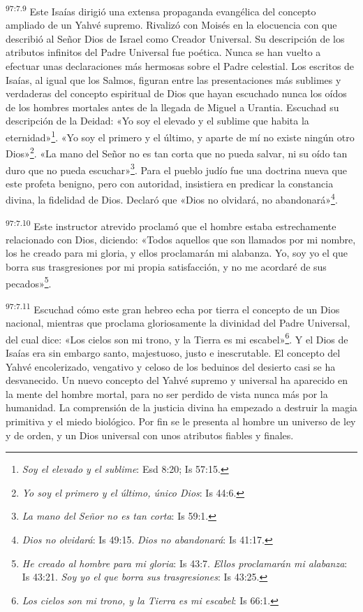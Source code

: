 \par
\textsuperscript{97:7.9} Este Isaías dirigió una extensa propaganda evangélica del concepto ampliado de un Yahvé supremo. Rivalizó con Moisés en la elocuencia con que describió al Señor Dios de Israel como Creador Universal. Su descripción de los atributos infinitos del Padre Universal fue poética. Nunca se han vuelto a efectuar unas declaraciones más hermosas sobre el Padre celestial. Los escritos de Isaías, al igual que los Salmos, figuran entre las presentaciones más sublimes y verdaderas del concepto espiritual de Dios que hayan escuchado nunca los oídos de los hombres mortales antes de la llegada de Miguel a Urantia. Escuchad su descripción de la Deidad: «Yo soy el elevado y el sublime que habita la eternidad»\footnote{\textit{Soy el elevado y el sublime}: Esd 8:20; Is 57:15.}. «Yo soy el primero y el último, y aparte de mí no existe ningún otro Dios»\footnote{\textit{Yo soy el primero y el último, único Dios}: Is 44:6.}. «La mano del Señor no es tan corta que no pueda salvar, ni su oído tan duro que no pueda escuchar»\footnote{\textit{La mano del Señor no es tan corta}: Is 59:1.}. Para el pueblo judío fue una doctrina nueva que este profeta benigno, pero con autoridad, insistiera en predicar la constancia divina, la fidelidad de Dios. Declaró que «Dios no olvidará, no abandonará»\footnote{\textit{Dios no olvidará}: Is 49:15. \textit{Dios no abandonará}: Is 41:17.}.

\par
\textsuperscript{97:7.10} Este instructor atrevido proclamó que el hombre estaba estrechamente relacionado con Dios, diciendo: «Todos aquellos que son llamados por mi nombre, los he creado para mi gloria, y ellos proclamarán mi alabanza. Yo, soy yo el que borra sus trasgresiones por mi propia satisfacción, y no me acordaré de sus pecados»\footnote{\textit{He creado al hombre para mi gloria}: Is 43:7. \textit{Ellos proclamarán mi alabanza}: Is 43:21. \textit{Soy yo el que borra sus trasgresiones}: Is 43:25.}.

\par
\textsuperscript{97:7.11} Escuchad cómo este gran hebreo echa por tierra el concepto de un Dios nacional, mientras que proclama gloriosamente la divinidad del Padre Universal, del cual dice: «Los cielos son mi trono, y la Tierra es mi escabel»\footnote{\textit{Los cielos son mi trono, y la Tierra es mi escabel}: Is 66:1.}. Y el Dios de Isaías era sin embargo santo, majestuoso, justo e inescrutable. El concepto del Yahvé encolerizado, vengativo y celoso de los beduinos del desierto casi se ha desvanecido. Un nuevo concepto del Yahvé supremo y universal ha aparecido en la mente del hombre mortal, para no ser perdido de vista nunca más por la humanidad. La comprensión de la justicia divina ha empezado a destruir la magia primitiva y el miedo biológico. Por fin se le presenta al hombre un universo de ley y de orden, y un Dios universal con unos atributos fiables y finales.

